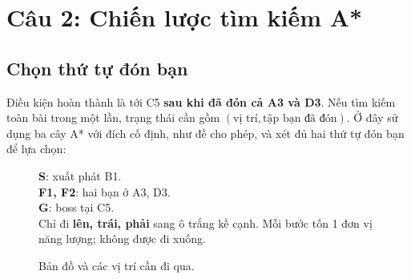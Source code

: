 \clearpage
\section{Câu 2: Chiến lược tìm kiếm A*}
\subsection{Chọn thứ tự đón bạn}

Điều kiện hoàn thành là tới C5 \textbf{sau khi đã đón cả A3 và D3}. Nếu tìm kiếm toàn bài trong một lần, trạng thái cần gồm $(\text{vị trí},\text{tập bạn đã đón})$. Ở đây sử dụng ba cây A* với đích cố định, như đề cho phép, và xét đủ hai thứ tự đón bạn để lựa chọn:

\begin{figure}[ht!]
    \centering
    \begin{minipage}[c]{0.44\textwidth}
        \centering
    \end{minipage}\hfill
    \begin{minipage}[c]{0.52\textwidth}
        \small
        \textbf{S}: xuất phát B1.\\
        \textbf{F1, F2}: hai bạn ở A3, D3.\\
        \textbf{G}: boss tại C5.\\[4pt]
        Chỉ đi \textbf{lên, trái, phải} sang ô trắng kề cạnh. Mỗi bước tốn 1 đơn vị năng lượng; không được đi xuống.
    \end{minipage}
    \caption{Bản đồ và các vị trí cần đi qua.}
\end{figure}


